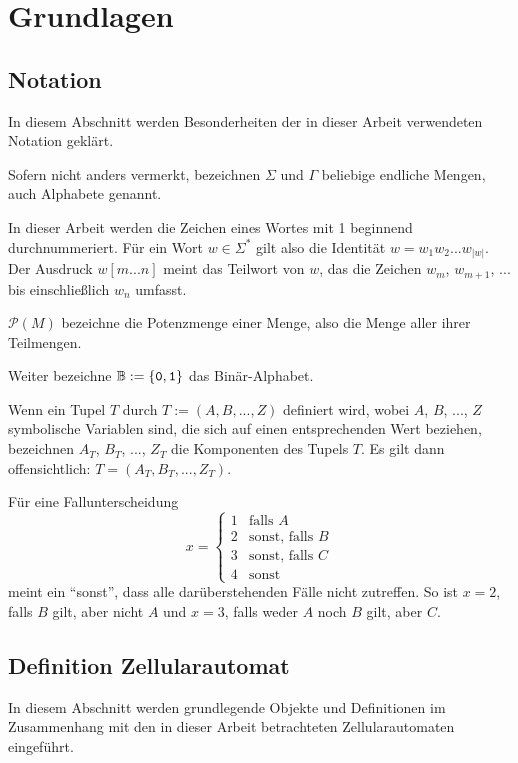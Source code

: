 \chapter{Grundlagen}
\label{chap:Grundlagen}

\section{Notation}

In diesem Abschnitt werden Besonderheiten der in dieser Arbeit verwendeten Notation geklärt.

Sofern nicht anders vermerkt, bezeichnen $\Sigma$ und $\Gamma$ beliebige endliche Mengen, auch Alphabete genannt.

In dieser Arbeit werden die Zeichen eines Wortes mit 1 beginnend durchnummeriert.
Für ein Wort $w \in \Sigma^*$ gilt also die Identität $w = w_1w_2...w_{|w|}$.
Der Ausdruck $w[m...n]$ meint das Teilwort von $w$, das die Zeichen $w_m$, $w_{m+1}$, ... bis einschließlich $w_n$ umfasst.

$\mathcal{P}(M)$ bezeichne die Potenzmenge einer Menge, also die Menge aller ihrer Teilmengen.

Weiter bezeichne $\mathbb{B} := \{ { \texttt{0}, \texttt{1}} \}$ das Binär-Alphabet.

Wenn ein Tupel $T$ durch $T := (A, B, ..., Z)$ definiert wird, wobei $A$, $B$, ..., $Z$ symbolische Variablen sind,
die sich auf einen entsprechenden Wert beziehen,
bezeichnen $A_T$, $B_T$, ..., $Z_T$ die Komponenten des Tupels $T$. Es gilt dann offensichtlich: $T = (A_T, B_T, ..., Z_T)$.

Für eine Fallunterscheidung
\[
    x = \begin{cases}
        1 & \text{falls } A \\
        2 & \text{sonst, falls } B \\
        3 & \text{sonst, falls } C \\
        4 & \text{sonst}
    \end{cases}
\]
meint ein \enquote{sonst}, dass alle darüberstehenden Fälle nicht zutreffen.
So ist $x = 2$, falls $B$ gilt, aber nicht $A$ und $x = 3$, falls weder $A$ noch $B$ gilt, aber $C$.

\section{Definition Zellularautomat}

In diesem Abschnitt werden grundlegende Objekte und Definitionen im Zusammenhang mit den in dieser Arbeit betrachteten Zellularautomaten eingeführt.

